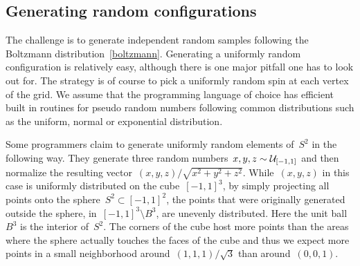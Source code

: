 \subsection{Generating random configurations}\label{subsec:random}

The challenge is to generate independent random samples following the Boltzmann
distribution~\eqref{boltzmann}. Generating a uniformly random configuration is
relatively easy, although there is one major pitfall one has to look out for.
The strategy is of course to pick a uniformly random spin at each vertex of the
grid. We assume that the programming language of choice has efficient built in
routines for pseudo random numbers following common distributions such as the
uniform, normal or exponential distribution.

Some programmers claim to generate uniformly random elements of~$S^2$ in the
following way. They generate three random numbers~$x,y,z \sim \mathcal{U}_{[-1,1]}$ and
then normalize the resulting vector~$(x,y,z) / \sqrt{x^2 + y^2 + z^2}$.
While~$(x,y,z)$ in this case is uniformly distributed on the cube~$[-1,1]^3$, by
simply projecting all points onto the sphere~$S^2 \subset [-1,1]^2$, the points
that were originally generated outside the sphere, \ie{} in~$[-1,1]^3 \setminus
B^3$, are unevenly distributed. Here the unit ball~$B^3$ is the interior
of~$S^2$. The corners of the cube host more points than the areas where the
sphere actually touches the faces of the cube and thus we expect more points in
a small neighborhood around~$(1,1,1)/\sqrt{3}$ than around~$(0,0,1)$.

